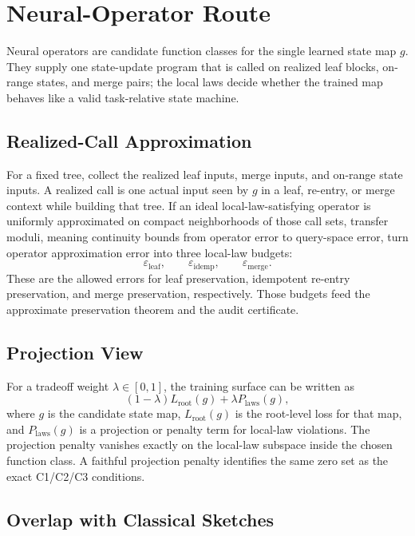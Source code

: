 \section{Neural-Operator Route}
\label{app:v8-neural-operator-route}

Neural operators are candidate function classes for the single learned state
map \(g\). They supply one state-update program that is called on realized
leaf blocks, on-range states, and merge pairs; the local laws decide whether
the trained map behaves like a valid task-relative state machine.

\subsection{Realized-Call Approximation}

For a fixed tree, collect the realized leaf inputs, merge inputs, and on-range
state inputs. A realized call is one actual input seen by \(g\) in a leaf,
re-entry, or merge context while building that tree. If an ideal local-law-satisfying
operator is uniformly approximated on compact neighborhoods of those call
sets, transfer moduli, meaning continuity bounds from operator error to
query-space error, turn operator approximation error into three local-law
budgets:
\[
  \varepsilon_{\mathrm{leaf}},\qquad
  \varepsilon_{\mathrm{idemp}},\qquad
  \varepsilon_{\mathrm{merge}} .
\]
These are the allowed errors for leaf preservation, idempotent re-entry
preservation, and merge preservation, respectively.
Those budgets feed the approximate preservation theorem and the audit
certificate.

\subsection{Projection View}

For a tradeoff weight \(\lambda\in[0,1]\), the training surface can be written
as
\[
  (1-\lambda)L_{\mathrm{root}}(g)
  +
  \lambda P_{\mathrm{laws}}(g),
\]
where \(g\) is the candidate state map, \(L_{\mathrm{root}}(g)\) is the
root-level loss for that map, and \(P_{\mathrm{laws}}(g)\) is a projection or
penalty term for local-law violations. The projection penalty vanishes exactly
on the local-law subspace inside the chosen function class. A faithful
projection penalty identifies the same zero set as the exact C1/C2/C3
conditions.

\subsection{Overlap with Classical Sketches}

